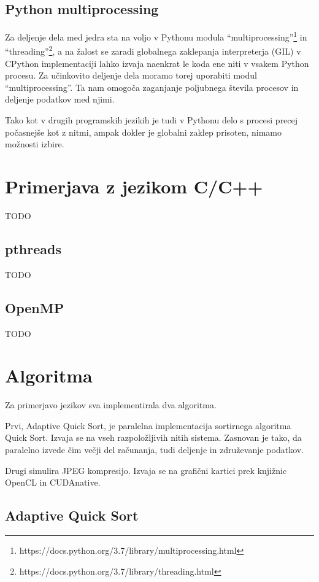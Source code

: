 \documentclass[journal,a4paper,twoside]{sty/IEEEtran}
\begin{document}
\subsection{Python multiprocessing}

Za deljenje dela med jedra sta na voljo v Pythonu modula “multiprocessing”\footnote{https://docs.python.org/3.7/library/multiprocessing.html} in
	“threading”\footnote{https://docs.python.org/3.7/library/threading.html}, a na žalost se zaradi globalnega zaklepanja interpreterja
	(GIL)\cite{python-gil} v CPython implementaciji lahko izvaja naenkrat le koda ene niti v vsakem Python procesu.
Za učinkovito deljenje dela moramo torej uporabiti modul “multiprocessing”.
Ta nam omogoča zaganjanje poljubnega števila procesov in deljenje podatkov med njimi.

Tako kot v drugih programskih jezikih je tudi v Pythonu delo s procesi precej počasnejše kot z nitmi, ampak dokler je globalni zaklep prisoten, nimamo
	možnosti izbire.

\section{Primerjava z jezikom C/C++}

TODO

\subsection{pthreads}

TODO

\subsection{OpenMP}

TODO

\section{Algoritma}

Za primerjavo jezikov sva implementirala dva algoritma.

Prvi, Adaptive Quick Sort, je paralelna implementacija sortirnega algoritma Quick Sort.
Izvaja se na vseh razpoložljivih nitih sistema.
Zasnovan je tako, da paralelno izvede čim večji del računanja, tudi deljenje in združevanje podatkov.

Drugi simulira JPEG kompresijo.
Izvaja se na grafični kartici prek knjižnic OpenCL in CUDAnative.

\subsection{Adaptive Quick Sort}
\end{document}
